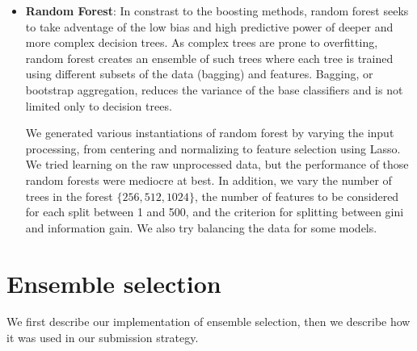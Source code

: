 \documentclass{article}
\renewcommand{\(}{\left(}
\renewcommand{\)}{\right)}
\begin{document}
\begin{itemize}
    \item \textbf{Random Forest}: In constrast to the boosting methods, random forest seeks to take adventage of the low bias and high predictive power of deeper and more complex decision trees.  As complex trees are prone to overfitting, random forest creates an ensemble of such trees where each tree is trained using different subsets of the data (bagging) and features. Bagging, or bootstrap aggregation, reduces the variance of the base classifiers and is not limited only to decision trees.    

      We generated various instantiations of random forest by varying the input processing, from centering and normalizing to feature selection using Lasso.  We tried learning on the raw unprocessed data, but the performance of those random forests were mediocre at best.  In addition, we vary the number of trees in the forest $\{256, 512, 1024\}$, the number of features to be considered for each split between 1 and 500, and the criterion for splitting between gini and information gain.  We also try balancing the data for some models.   
  \end{itemize}

\section{Ensemble selection} \label{sec:ensemble}
We first describe our implementation of ensemble selection, then we describe how it was used in our submission strategy.
\end{document}
